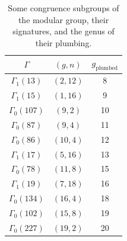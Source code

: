 \documentclass[12pt]{amsart}
\numberwithin{equation}{section}
\begin{document}
{\footnotesize
\begin{table}[ht]
\begin{center}
\caption{Some congruence subgroups of the modular group, their signatures, and the genus of their plumbing.}\label{table:compactifications}
\begin{tabular}{|c|c|c|}
\hline
$\Gamma$  & $(g,n)$  & $g_{\mathrm{plumbed}}$ \\
 \hline 
  $\Gamma_1(13)$ & $(2,12)$ & 8\\
  $\Gamma_1(15)$ & $(1,16)$ & 9\\
  $\Gamma_0(107)$ & $(9,2)$ & 10\\
  $\Gamma_0(87)$ & $(9,4)$ & 11\\
  $\Gamma_0(86)$ & $(10,4)$ & 12\\
  $\Gamma_1(17)$ & $(5,16)$ & 13\\
  $\Gamma_0(78)$ & $(11,8)$ & 15\\
  $\Gamma_1(19)$ & $(7,18)$ & 16\\
  $\Gamma_0(134)$ & $(16,4)$ & 18\\
  $\Gamma_0(102)$ & $(15,8)$ & 19\\
$\Gamma_0(227)$ & $(19,2)$ & 20\\
\hline
\end{tabular}
\end{center}
\end{table}
}
\end{document}
